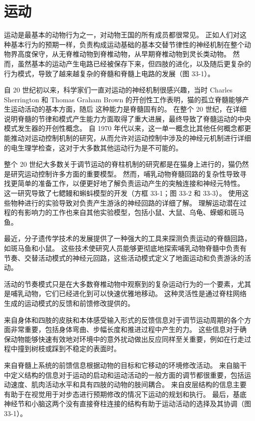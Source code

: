 \chapter{运动}

运动是最基本的动物行为之一，对动物王国的所有成员都很常见。 正如人们对这种基本行为的预期一样，负责构成运动基础的基本交替节律性的神经机制在整个动物界高度保守，从无脊椎动物到脊椎动物，从早期脊椎动物到灵长类动物。 然而，虽然基本的运动产生电路已经被保存下来，但四肢的进化，以及随后更复杂的行为模式，导致了越来越复杂的脊髓和脊髓上电路的发展（图 33-1）。

自 20 世纪初以来，科学家们一直对运动的神经机制很感兴趣，当时 Charles Sherrington 和 Thomas Graham Brown 的开创性工作表明，猫的孤立脊髓能够产生运动活动的基本方面，随后 这种能力是脊髓固有的。 在整个 20 世纪，在详细说明脊髓的节律和模式产生能力方面取得了重大进展，最终导致了脊髓运动的中央模式发生器的开创性概念。 自 1970 年代以来，这一单一概念比其他任何概念都更能推动对运动控制机制的研究，从而允许对运动控制中涉及的神经元机制进行详细的电生理学检查，这对于大多数其他运动行为是不可能的。

整个 20 世纪大多数关于调节运动的脊柱机制的研究都是在猫身上进行的，猫仍然是研究运动控制许多方面的重要模型。 然而，哺乳动物脊髓回路的复杂性导致寻找更简单的准备工作，以便更好地了解负责运动产生的突触连接和神经元特性。 这一研究导致了七鳃鳗和蝌蚪模型的开发（方框 33-1；图 33-2 和 33-3）。 使用这些物种进行的实验导致对负责产生游泳的神经回路的详细了解。 理解运动潜在过程的有影响力的工作也来自其他实验模型，包括小鼠、大鼠、乌龟、蝾螈和斑马鱼。

最近，分子遗传学技术的发展提供了一种强大的工具来探测负责运动的脊髓回路，如斑马鱼和小鼠。 这些技术使研究人员能够更彻底地探索哺乳动物脊髓中负责有节奏、交替活动模式的神经元回路，这些活动模式定义了地面运动和负责游泳的活动。

活动的节奏模式只是在大多数脊椎动物中观察到的复杂运动行为的一个要素，尤其是哺乳动物，它们已经进化到可以快速优雅地移动。 这种灵活性是通过脊柱网络生成的运动模式的反馈和前馈修改提供的。

来自身体和四肢的皮肤和本体感受输入形式的反馈信息对于调节运动周期的各个方面非常重要，包括身体弯曲、步幅长度和推进过程中产生的力。 这些信息对于确保动物能够快速有效地对环境中的意外扰动做出反应同样至关重要，例如在行走过程中撞到树枝或踩到不稳定的表面时。

来自脊髓上系统的前馈信息根据动物的目标和它移动的环境修改活动。 来自脑干中定义结构的信息对于运动的启动和运动活动的一般方面的调节都很重要，包括运动速度、肌肉活动水平和具有四肢的动物的肢间耦合。 来自皮层结构的信息主要有助于在视觉用于对步态进行预期修改的情况下运动的规划和执行。 最后，基底神经节和小脑这两个没有直接脊柱连接的结构有助于运动活动的选择及其协调（图 33-1）。

